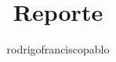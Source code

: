 \documentclass{mylib/reporteCirc}
\title{Reporte}
\author{rodrigofranciscopablo }
\begin{document}
\coverPage
\end{document}
